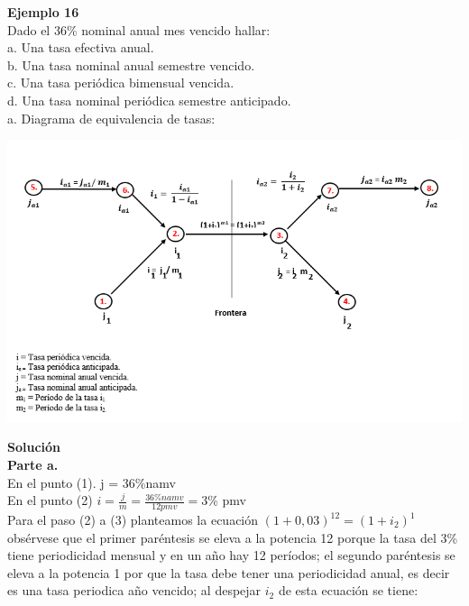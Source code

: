 \textbf{Ejemplo 16}\\

Dado el 36\% nominal anual mes vencido hallar:\\

a. Una tasa efectiva anual. \\ 
b. Una tasa nominal anual semestre vencido. \\
c. Una tasa periódica bimensual vencida. \\
d. Una tasa nominal periódica semestre anticipado. \\

a. Diagrama de equivalencia de tasas:\\
\begin{center}
	\includegraphics[height = 9.0 cm]{general}\\
\end{center}

\textbf{Solución}\\

\textbf{Parte a.}\\
En el punto (1). j = 36\%namv\\
En el punto (2) $i=\frac{j}{m} = \frac{36\%namv}{12 pmv} = 3$\% pmv\\
Para el paso (2) a (3) planteamos la ecuación $(1+0,03)^{12}= (1+i_{2})^1$ obsérvese que el primer paréntesis se eleva a la potencia 12 porque la tasa del 3\% tiene periodicidad mensual y en un año hay 12 períodos; el segundo paréntesis se eleva a la potencia 1 por que la tasa debe tener una periodicidad anual, es decir es una tasa periodica año vencido; al despejar $i_{2}$ de esta ecuación se tiene:\\

